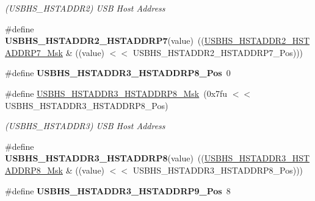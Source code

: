 \begin{DoxyCompactItemize}
\begin{DoxyCompactList}\small\item\em (U\+S\+B\+H\+S\+\_\+\+H\+S\+T\+A\+D\+D\+R2) U\+SB Host Address \end{DoxyCompactList}\item 
\mbox{\label{group__SAMS70__USBHS_ga73b2673fbe53e56ae5e4a7cbc2f2949f}} 
\#define {\bfseries U\+S\+B\+H\+S\+\_\+\+H\+S\+T\+A\+D\+D\+R2\+\_\+\+H\+S\+T\+A\+D\+D\+R\+P7}(value)~((\mbox{\hyperlink{group__SAMV71__USBHS_ga3c0a731ad16bca0bce8fe5eb35af9e2f}{U\+S\+B\+H\+S\+\_\+\+H\+S\+T\+A\+D\+D\+R2\+\_\+\+H\+S\+T\+A\+D\+D\+R\+P7\+\_\+\+Msk}} \& ((value) $<$$<$ U\+S\+B\+H\+S\+\_\+\+H\+S\+T\+A\+D\+D\+R2\+\_\+\+H\+S\+T\+A\+D\+D\+R\+P7\+\_\+\+Pos)))
\item 
\mbox{\label{group__SAMS70__USBHS_gabacf824c9b22255ea34cdcb087beb05c}} 
\#define {\bfseries U\+S\+B\+H\+S\+\_\+\+H\+S\+T\+A\+D\+D\+R3\+\_\+\+H\+S\+T\+A\+D\+D\+R\+P8\+\_\+\+Pos}~0
\item 
\mbox{\label{group__SAMS70__USBHS_gadea2e5a1320c92fb706cd154af7f626b}} 
\#define \mbox{\hyperlink{group__SAMS70__USBHS_gadea2e5a1320c92fb706cd154af7f626b}{U\+S\+B\+H\+S\+\_\+\+H\+S\+T\+A\+D\+D\+R3\+\_\+\+H\+S\+T\+A\+D\+D\+R\+P8\+\_\+\+Msk}}~(0x7fu $<$$<$ U\+S\+B\+H\+S\+\_\+\+H\+S\+T\+A\+D\+D\+R3\+\_\+\+H\+S\+T\+A\+D\+D\+R\+P8\+\_\+\+Pos)
\begin{DoxyCompactList}\small\item\em (U\+S\+B\+H\+S\+\_\+\+H\+S\+T\+A\+D\+D\+R3) U\+SB Host Address \end{DoxyCompactList}\item 
\mbox{\label{group__SAMS70__USBHS_ga0678d72186eacf376d3999a876012560}} 
\#define {\bfseries U\+S\+B\+H\+S\+\_\+\+H\+S\+T\+A\+D\+D\+R3\+\_\+\+H\+S\+T\+A\+D\+D\+R\+P8}(value)~((\mbox{\hyperlink{group__SAMV71__USBHS_gadea2e5a1320c92fb706cd154af7f626b}{U\+S\+B\+H\+S\+\_\+\+H\+S\+T\+A\+D\+D\+R3\+\_\+\+H\+S\+T\+A\+D\+D\+R\+P8\+\_\+\+Msk}} \& ((value) $<$$<$ U\+S\+B\+H\+S\+\_\+\+H\+S\+T\+A\+D\+D\+R3\+\_\+\+H\+S\+T\+A\+D\+D\+R\+P8\+\_\+\+Pos)))
\item 
\mbox{\label{group__SAMS70__USBHS_ga236b909f99bdb298b43a699a82c9cc2c}} 
\#define {\bfseries U\+S\+B\+H\+S\+\_\+\+H\+S\+T\+A\+D\+D\+R3\+\_\+\+H\+S\+T\+A\+D\+D\+R\+P9\+\_\+\+Pos}~8
$$
\end{DoxyCompactItemize}
